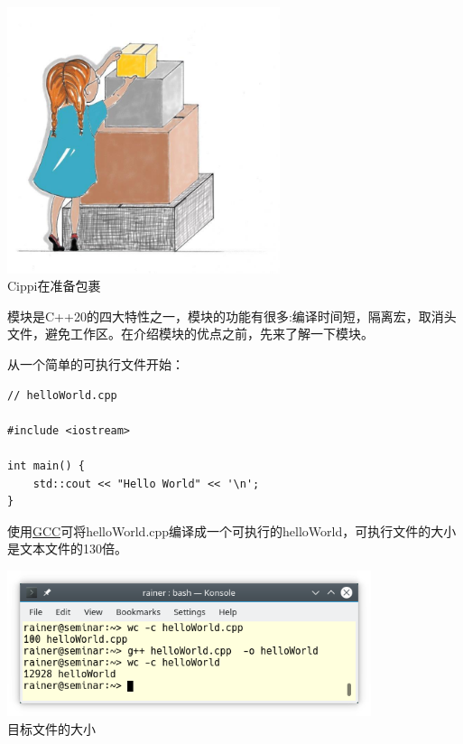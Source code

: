 

\begin{center}
\includegraphics[width=0.6\textwidth]{content/3/chapter4/images/11.png}\\
Cippi在准备包裹
\end{center}

模块是C++20的四大特性之一，模块的功能有很多:编译时间短，隔离宏，取消头文件，避免工作区。在介绍模块的优点之前，先来了解一下模块。


从一个简单的可执行文件开始：

\begin{lstlisting}[style=styleCXX]
// helloWorld.cpp

#include <iostream>

int main() {
	std::cout << "Hello World" << '\n';
}
\end{lstlisting}

使用\href{http://gcc.gnu.org/}{GCC}可将helloWorld.cpp编译成一个可执行的helloWorld，可执行文件的大小是文本文件的130倍。

\begin{center}
\includegraphics[width=0.8\textwidth]{content/3/chapter4/images/12.png}\\
目标文件的大小
\end{center}

